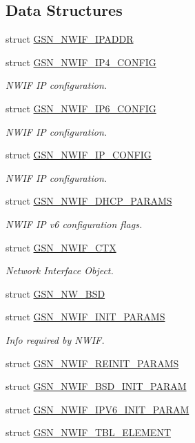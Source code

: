 \subsection*{Data Structures}
\begin{DoxyCompactItemize}
\item 
struct \hyperlink{a00173}{GSN\_\-NWIF\_\-IPADDR}
\item 
struct \hyperlink{a00170}{GSN\_\-NWIF\_\-IP4\_\-CONFIG}
\begin{DoxyCompactList}\small\item\em NWIF IP configuration. \end{DoxyCompactList}\item 
struct \hyperlink{a00171}{GSN\_\-NWIF\_\-IP6\_\-CONFIG}
\begin{DoxyCompactList}\small\item\em NWIF IP configuration. \end{DoxyCompactList}\item 
struct \hyperlink{a00172}{GSN\_\-NWIF\_\-IP\_\-CONFIG}
\begin{DoxyCompactList}\small\item\em NWIF IP configuration. \end{DoxyCompactList}\item 
struct \hyperlink{a00168}{GSN\_\-NWIF\_\-DHCP\_\-PARAMS}
\begin{DoxyCompactList}\small\item\em NWIF IP v6 configuration flags. \end{DoxyCompactList}\item 
struct \hyperlink{a00167}{GSN\_\-NWIF\_\-CTX}
\begin{DoxyCompactList}\small\item\em Network Interface Object. \end{DoxyCompactList}\item 
struct \hyperlink{a00163}{GSN\_\-NW\_\-BSD}
\item 
struct \hyperlink{a00169}{GSN\_\-NWIF\_\-INIT\_\-PARAMS}
\begin{DoxyCompactList}\small\item\em Info required by NWIF. \end{DoxyCompactList}\item 
struct \hyperlink{a00175}{GSN\_\-NWIF\_\-REINIT\_\-PARAMS}
\item 
struct \hyperlink{a00166}{GSN\_\-NWIF\_\-BSD\_\-INIT\_\-PARAM}
\item 
struct \hyperlink{a00174}{GSN\_\-NWIF\_\-IPV6\_\-INIT\_\-PARAM}
\item 
struct \hyperlink{a00177}{GSN\_\-NWIF\_\-TBL\_\-ELEMENT}
\end{DoxyCompactItemize}
